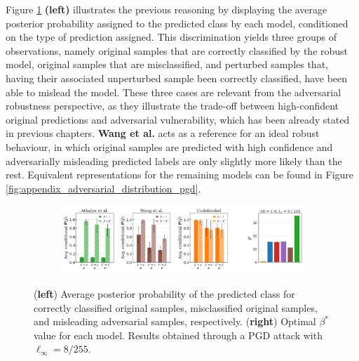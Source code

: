 Figure \ref{fig:unrobust_posterior_short_pgd} \textbf{(left)} illustrates
the previous reasoning by displaying the average posterior
probability assigned to the predicted class by each model, conditioned on the type
of prediction assigned. This discrimination yields three groups of observations,
namely original samples that are correctly classified by the robust model, 
original samples that are misclassified, and perturbed samples that, having their 
associated unperturbed sample been correctly classified, 
have been able to mislead the model. These three cases are relevant from the 
adversarial robustness perspective,  as they illustrate the trade-off between high-confident 
original predictions and adversarial vulnerability, which has been already stated in 
previous chapters. {\color{tab:brown} \textbf{Wang et al.}}
acts as a reference for an ideal robust behaviour, in which original samples are
predicted with high confidence and adversarially misleading predicted labels are 
only slightly more likely than the rest. Equivalent representations for the remaining
models can be found in Figure \ref{fig:appendix_adversarial_distribution_pgd}.\\

\begin{figure}[H]
    \centering
    \begin{subfigure}[b]{\textwidth}
        \centering
        \includegraphics[width=\textwidth]{img/results_discussion/adversarial/bpda_wang_undefended_beta_pgd.png}
    \end{subfigure}
   
    \caption{(\textbf{left}) Average posterior probability of the predicted class for 
    correctly classified original samples, misclassified original samples, and 
    misleading adversarial samples, respectively. (\textbf{right}) Optimal $\beta^{*}$ value for each model.
    Results obtained through a PGD attack with $\ell_\infty = 8 / 255$.}
    \label{fig:unrobust_posterior_short_pgd}
\end{figure}

